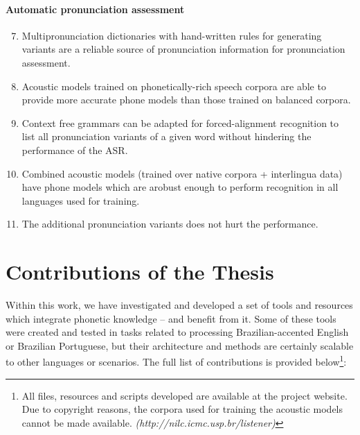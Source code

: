 \paragraph*{Automatic pronunciation assessment}
  \begin{enumerate}
    \setcounter{enumi}{6}
    \item Multipronunciation dictionaries with hand-written rules for generating variants are a reliable source of pronunciation information for pronunciation assessment.
    \item Acoustic models trained on phonetically-rich speech corpora are able to provide more accurate phone models than those trained on balanced corpora.
    \item Context free grammars can be adapted for forced-alignment recognition to list all pronunciation variants of a given word without hindering the performance of the \ac{ASR}.
    \item Combined acoustic models (trained over native corpora + interlingua data) have phone models which are arobust enough to perform recognition in all languages used for training.
    \item The additional pronunciation variants does not hurt the performance.
  \end{enumerate}

\section*{Contributions of the Thesis} 

Within this work, we have investigated and developed a set of tools and resources which integrate phonetic knowledge -- and benefit from it. Some of these tools were created and tested in tasks related to processing Brazilian-accented English or Brazilian Portuguese, but their architecture and methods are certainly scalable to other languages or scenarios. The full list of contributions is provided below\footnote{All files, resources and scripts developed are available at the project website. Due to copyright reasons, the corpora used for training the acoustic models cannot be made available.  \emph{(http://nilc.icmc.usp.br/listener)}}:

